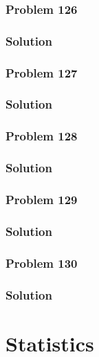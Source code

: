 \documentclass[journal,12pt,twocolumn]{IEEEtran}
\begin{document}
\subsubsection{Problem 126}

%
\subsubsection{Solution}



\subsubsection{Problem 127}

%
\subsubsection{Solution}


\subsubsection{Problem 128}

%
\subsubsection{Solution}

%
\subsubsection{Problem 129}

%
\subsubsection{Solution}


\subsubsection{Problem 130}

%
\subsubsection{Solution}


\section{Statistics}
\end{document}
